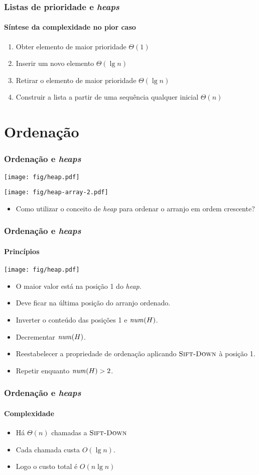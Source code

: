\documentclass{beamer}
\begin{document}
\begin{frame}

\frametitle{Listas de prioridade e \textit{heaps\/}}
\framesubtitle{Síntese da complexidade no pior caso}

\begin{enumerate}
\item Obter elemento de maior prioridade $\Theta(1)$
\item Inserir um novo elemento $\Theta(\lg n)$
\item Retirar o elemento de maior prioridade  $\Theta(\lg n)$
\item Construir a lista a partir de uma sequência qualquer inicial $\Theta(n)$
\end{enumerate}

\end{frame}

\section{Ordenação}

\begin{frame}

\frametitle{Ordenação e \textit{heaps\/}}

{\center \texttt{[image: fig/heap.pdf]}}

{\center \texttt{[image: fig/heap-array-2.pdf]}}

\begin{itemize}
\item Como utilizar o conceito de \textit{heap\/} para ordenar o arranjo em
  ordem crescente?
\end{itemize}

\end{frame}

\begin{frame}

\frametitle{Ordenação e \textit{heaps\/}}
\framesubtitle{Princípios}

{\center \texttt{[image: fig/heap.pdf]}}

\begin{itemize}
\item O maior valor está na posição 1 do \textit{heap\/}.
\item Deve ficar na última posição do arranjo ordenado.
\pause
\item Inverter o conteúdo das posições 1 e $\id{num}(H)$.
\item Decrementar $\id{num}(H)$.
\item Reestabelecer a propriedade de ordenação aplicando $\textnormal{\scshape Sift-Down}$
  à posição 1.
\item Repetir enquanto $\id{num}(H) > 2$.
\end{itemize}

\end{frame}

\begin{frame}

\frametitle{Ordenação e \textit{heaps\/}}
\framesubtitle{Complexidade}

\begin{itemize}
\item Há $\Theta(n)$ chamadas a $\textnormal{\scshape Sift-Down}$
\item Cada chamada custa $O(\lg n)$.
\item Logo o custo total é $O(n \lg n)$
\end{itemize}

\end{frame}
\end{document}
